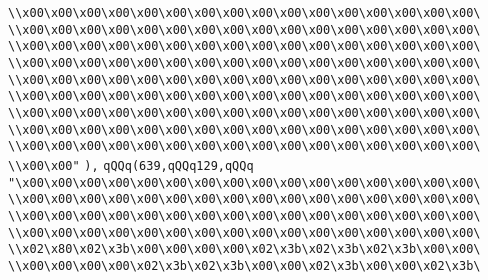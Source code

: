 \verb|\\x00\x00\x00\x00\x00\x00\x00\x00\x00\x00\x00\x00\x00\x00\x00\x00\|\newline
\verb|\\x00\x00\x00\x00\x00\x00\x00\x00\x00\x00\x00\x00\x00\x00\x00\x00\|\newline
\verb|\\x00\x00\x00\x00\x00\x00\x00\x00\x00\x00\x00\x00\x00\x00\x00\x00\|\newline
\verb|\\x00\x00\x00\x00\x00\x00\x00\x00\x00\x00\x00\x00\x00\x00\x00\x00\|\newline
\verb|\\x00\x00\x00\x00\x00\x00\x00\x00\x00\x00\x00\x00\x00\x00\x00\x00\|\newline
\verb|\\x00\x00\x00\x00\x00\x00\x00\x00\x00\x00\x00\x00\x00\x00\x00\x00\|\newline
\verb|\\x00\x00\x00\x00\x00\x00\x00\x00\x00\x00\x00\x00\x00\x00\x00\x00\|\newline
\verb|\\x00\x00\x00\x00\x00\x00\x00\x00\x00\x00\x00\x00\x00\x00\x00\x00\|\newline
\verb|\\x00\x00\x00\x00\x00\x00\x00\x00\x00\x00\x00\x00\x00\x00\x00\x00\|\newline
\verb|\\x00\x00"|\newline
\verb|),|\newline
\verb|qQQq(639,qQQq129,qQQq|\newline
\verb|"\x00\x00\x00\x00\x00\x00\x00\x00\x00\x00\x00\x00\x00\x00\x00\x00\|\newline
\verb|\\x00\x00\x00\x00\x00\x00\x00\x00\x00\x00\x00\x00\x00\x00\x00\x00\|\newline
\verb|\\x00\x00\x00\x00\x00\x00\x00\x00\x00\x00\x00\x00\x00\x00\x00\x00\|\newline
\verb|\\x00\x00\x00\x00\x00\x00\x00\x00\x00\x00\x00\x00\x00\x00\x00\x00\|\newline
\verb|\\x02\x80\x02\x3b\x00\x00\x00\x00\x02\x3b\x02\x3b\x02\x3b\x00\x00\|\newline
\verb|\\x00\x00\x00\x00\x02\x3b\x02\x3b\x00\x00\x02\x3b\x00\x00\x02\x3b\|\newline
